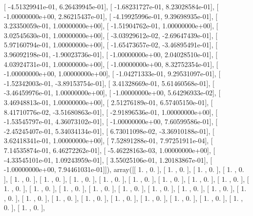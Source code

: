 \documentclass{article}
\begin{document}
       [ -4.51329941e-01,   6.26439945e-01],
       [ -1.68231727e-01,   8.23028584e-01],
       [ -1.00000000e+00,   2.86215437e-01],
       [ -4.19925996e-01,   9.39698935e-01],
       [  3.23350059e-01,   1.00000000e+00],
       [ -1.51904762e-01,   1.00000000e+00],
       [  3.02545630e-01,   1.00000000e+00],
       [ -3.03929612e-02,  -2.69647439e-01],
       [  5.97160794e-01,   1.00000000e+00],
       [ -1.65473657e-02,  -3.46895491e-01],
       [  3.96092198e-01,  -1.90023736e-01],
       [ -1.00000000e+00,   2.04028510e-01],
       [  4.03924731e-01,   1.00000000e+00],
       [ -1.00000000e+00,   8.32752354e-01],
       [ -1.00000000e+00,   1.00000000e+00],
       [ -1.04271333e-01,   9.29531097e-01],
       [ -1.52342003e-01,  -3.89153754e-01],
       [  3.41328669e-01,   5.61460568e-01],
       [ -3.46459976e-01,   1.00000000e+00],
       [ -1.00000000e+00,   5.64296933e-02],
       [  3.46948813e-01,   1.00000000e+00],
       [  2.51276189e-01,   6.57405150e-01],
       [  8.41710776e-02,  -3.51680863e-01],
       [ -2.91896536e-01,   1.00000000e+00],
       [ -1.53545797e-01,   4.36073102e-01],
       [ -1.00000000e+00,   7.60599586e-01],
       [ -2.45245407e-01,   5.34034134e-01],
       [  6.73011098e-02,  -3.36910188e-01],
       [  3.62418341e-01,   1.00000000e+00],
       [  7.52891288e-01,   7.97251911e-04],
       [  7.14535874e-01,   6.46272262e-01],
       [ -5.46228163e-03,   1.00000000e+00],
       [ -4.33545101e-01,   1.09243959e-01],
       [  3.55025106e-01,   1.20183867e-01],
       [ -1.00000000e+00,   7.94461031e-01]]), array([[ 1.        ,  0.        ],
       [ 1.        ,  0.        ],
       [ 1.        ,  0.        ],
       [ 1.        ,  0.        ],
       [ 1.        ,  0.        ],
       [ 1.        ,  0.        ],
       [ 1.        ,  0.        ],
       [ 1.        ,  0.        ],
       [ 1.        ,  0.        ],
       [ 1.        ,  0.        ],
       [ 1.        ,  0.        ],
       [ 1.        ,  0.        ],
       [ 1.        ,  0.        ],
       [ 1.        ,  0.        ],
       [ 1.        ,  0.        ],
       [ 1.        ,  0.        ],
       [ 1.        ,  0.        ],
       [ 1.        ,  0.        ],
       [ 1.        ,  0.        ],
       [ 1.        ,  0.        ],
       [ 1.        ,  0.        ],
       [ 1.        ,  0.        ],
       [ 1.        ,  0.        ],
       [ 1.        ,  0.        ],
       [ 1.        ,  0.        ],
       [ 1.        ,  0.        ],
       [ 1.        ,  0.        ],
       [ 1.        ,  0.        ],
       [ 1.        ,  0.        ],
       [ 1.        ,  0.        ],
\end{document}

